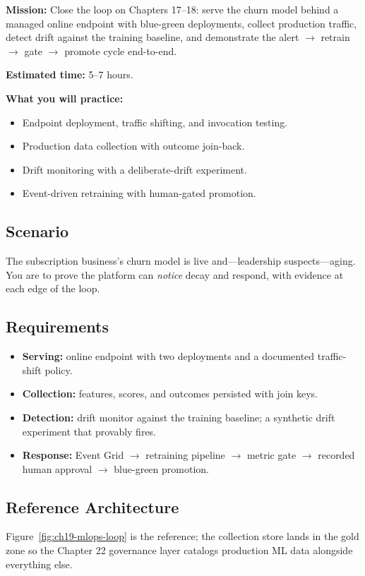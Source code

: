 \begin{capstonebox}
\textbf{Mission:} Close the loop on Chapters 17--18: serve the churn model behind a managed online endpoint with blue-green deployments, collect production traffic, detect drift against the training baseline, and demonstrate the alert $\rightarrow$ retrain $\rightarrow$ gate $\rightarrow$ promote cycle end-to-end.

\textbf{Estimated time:} 5--7 hours.

\textbf{What you will practice:}
\begin{itemize}
    \item Endpoint deployment, traffic shifting, and invocation testing.
    \item Production data collection with outcome join-back.
    \item Drift monitoring with a deliberate-drift experiment.
    \item Event-driven retraining with human-gated promotion.
\end{itemize}
\end{capstonebox}

\subsection*{Scenario}
The subscription business's churn model is live and---leadership suspects---aging. You are to prove the platform can \emph{notice} decay and respond, with evidence at each edge of the loop.

\subsection*{Requirements}
\begin{itemize}
    \item \textbf{Serving:} online endpoint with two deployments and a documented traffic-shift policy.
    \item \textbf{Collection:} features, scores, and outcomes persisted with join keys.
    \item \textbf{Detection:} drift monitor against the training baseline; a synthetic drift experiment that provably fires.
    \item \textbf{Response:} Event Grid $\rightarrow$ retraining pipeline $\rightarrow$ metric gate $\rightarrow$ recorded human approval $\rightarrow$ blue-green promotion.
\end{itemize}

\subsection*{Reference Architecture}
Figure~\ref{fig:ch19-mlops-loop} is the reference; the collection store lands in the gold zone so the Chapter 22 governance layer catalogs production ML data alongside everything else.

